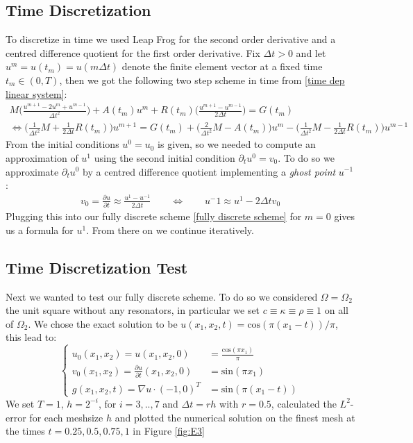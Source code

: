 \documentclass{article}
\begin{document}
\subsection{Time Discretization}
To discretize in time we used Leap Frog for the second order derivative and a centred difference quotient for the first order derivative. Fix $\Delta t > 0$ and let $u^m = u(t_m) = u(m \Delta t)$ denote the finite element vector at a fixed time $t_m \in (0,T)$, then we got the following two step scheme in time from \eqref{time dep linear system}:
\begin{equation}\label{fully discrete scheme}
\begin{aligned}
	M\Big(\frac{u^{m+1} - 2u^m +u^{m-1}}{\Delta t^2}\Big) + 
	A(t_m)u^m + R(t_m)\Big(\frac{u^{m+1}-u^{m-1}}{2\Delta t}\Big) = G(t_m) \\
	\Leftrightarrow \Big(\frac{1}{\Delta t^2} M + \frac{1}{2\Delta t} R(t_m)\Big)u^{m+1} = 	
	G(t_m) + \Big(\frac{2}{\Delta t^2} M - A(t_m)\Big)u^m - 
	\Big(\frac{1}{\Delta t^2}M - \frac{1}{2\Delta t}R(t_m)\Big)u^{m-1}
\end{aligned}
\end{equation}
From the initial conditions $u^0 = u_0$ is given, so we needed to compute an approximation of $u^1$ using the second initial condition $\partial_t u^0 = v_0$. To do so we approximate $\partial_t u^0$ by a centred difference quotient implementing a \textit{ghost point} $u^{-1}$:
\begin{align*}
	v_0 = \frac{\partial u}{\partial t} \approx \frac{u^1 - u^{-1}}{2\Delta t} \qquad
	\Leftrightarrow \qquad u^-1 \approx u^1 - 2\Delta t v_0
\end{align*}
Plugging this into our fully discrete scheme \eqref{fully discrete scheme} for $m=0$ gives us a formula for $u^1$. From there on we continue iteratively. 
\subsection{Time Discretization Test}
Next we wanted to test our fully discrete scheme. To do so we considered $\Omega = \Omega_2$ the unit square without any resonators, in particular we set $c \equiv \kappa \equiv \rho \equiv 1$ on all of $\Omega_2$. We chose the exact solution to be $u(x_1,x_2,t) = \text{cos}(\pi(x_1-t))/\pi$, this lead  to:
\begin{equation*}
\left\{
	\begin{aligned}
		u_0(x_1,x_2) = u(x_1,x_2,0) &= \frac{\text{cos}(\pi x_1)}{\pi} \\
		v_0(x_1,x_2) = \frac{\partial u}{\partial t}(x_1,x_2,0) &= \text{sin}(\pi x_1) \\
		g(x_1,x_2,t) = \nabla u \cdot (-1,0)^T &= \text{sin}(\pi (x_1 - t))
	\end{aligned}
	\right.
\end{equation*}
We set $T = 1$, $h = 2^{-i}$, for $i = 3,..,7$ and $\Delta t = r h$ with $r = 0.5$, calculated the $L^2$-error for each meshsize $h$ and plotted the numerical solution on the finest mesh at the times $t = 0.25, 0.5, 0.75, 1$ in Figure \eqref{fig:E3}
\end{document}
